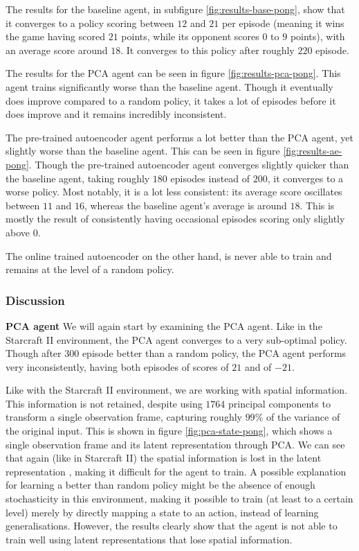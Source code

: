 The results for the baseline agent, in subfigure \ref{fig:results-base-pong}, show that it converges to a policy scoring between $12$ and $21$ per episode (meaning it wins the game having scored $21$ points, while its opponent scores $0$ to $9$ points), with an average score around $18$. It converges to this policy after roughly $220$ episode.

The results for the PCA agent can be seen in figure \ref{fig:results-pca-pong}. This agent trains significantly worse than the baseline agent. Though it eventually does improve compared to a random policy, it takes a lot of episodes before it does improve and it remains incredibly inconsistent. %

The pre-trained autoencoder agent performs a lot better than the PCA agent, yet slightly worse than the baseline agent. This can be seen in figure \ref{fig:results-ae-pong}. Though the pre-trained autoencoder agent converges slightly quicker than the baseline agent, taking roughly $180$ episodes instead of $200$, it converges to a worse policy. Most notably, it is a lot less consistent: its average score oscillates between $11$ and $16$, whereas the baseline agent's average is around $18$. This is mostly the result of consistently having occasional episodes scoring only slightly above $0$.

The online trained autoencoder on the other hand, is never able to train and remains at the level of a random policy.

\subsubsection{Discussion}\label{research-discussion-pong}
\textbf{PCA agent}\newline
\noindent
We will again start by examining the PCA agent. Like in the Starcraft II environment, the PCA agent converges to a very sub-optimal policy. Though after $300$ episode better than a random policy, the PCA agent performs very inconsistently, having both episodes of scores of $21$ and of $-21$.

Like with the Starcraft II environment, we are working with spatial information. This information is not retained, despite using $1764$ principal components to transform a single observation frame, capturing roughly $99\%$ of the variance of the original input. This is shown in figure \ref{fig:pca-state-pong}, which shows a single observation frame and its latent representation through PCA. We can see that again (like in Starcraft II) the spatial information is lost in the latent representation , making it difficult for the agent to train. A possible explanation for learning a better than random policy might be the absence of enough stochasticity in this environment, making it possible to train (at least to a certain level) merely by directly mapping a state to an action, instead of learning generalisations. However, the results clearly show that the agent is not able to train well using latent representations that lose spatial information. \newline


